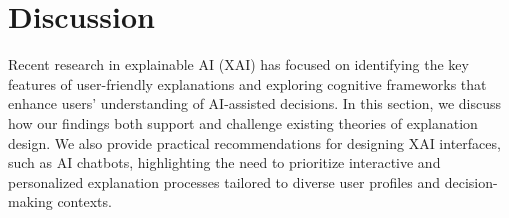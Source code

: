 \section{Discussion}\label{sec:discussion}
Recent research in explainable AI (XAI) has focused on identifying the key features of user-friendly explanations and exploring cognitive frameworks that enhance users' understanding of AI-assisted decisions. In this section, we discuss how our findings both support and challenge existing theories of explanation design. We also provide practical recommendations for designing XAI interfaces, such as AI chatbots, highlighting the need to prioritize interactive and personalized explanation processes tailored to diverse user profiles and decision-making contexts.

